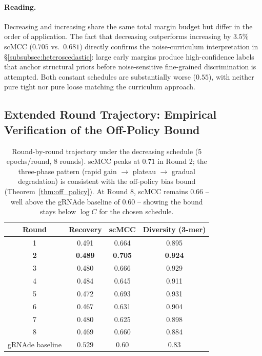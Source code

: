 {{\paragraph{Reading.}
Decreasing and increasing share the same total margin budget but differ in the order of application. The fact that decreasing outperforms increasing by $3.5\%$ scMCC ($0.705$ vs.\ $0.681$) directly confirms the noise-curriculum interpretation in \S\ref{subsubsec:heteroscedastic}: large early margins produce high-confidence labels that anchor structural priors before noise-sensitive fine-grained discrimination is attempted. Both constant schedules are substantially worse ($0.55$), with neither pure tight nor pure loose matching the curriculum approach.


\subsection{Extended Round Trajectory: Empirical Verification of the Off-Policy Bound}
\label{app:extended_rounds}

\begin{table}[h]
\centering
\caption{Round-by-round trajectory under the decreasing schedule (5 epochs/round, 8 rounds). scMCC peaks at $0.71$ in Round 2; the three-phase pattern (rapid gain $\to$ plateau $\to$ gradual degradation) is consistent with the off-policy bias bound (Theorem~\ref{thm:off_policy}). At Round 8, scMCC remains $0.66$ -- well above the gRNAde baseline of $0.60$ -- showing the bound stays below $\log C$ for the chosen schedule.}
\label{tab:extended_rounds}
\small
\begin{tabular}{cccc}
\toprule
\textbf{Round} & \textbf{Recovery} & \textbf{scMCC} & \textbf{Diversity (3-mer)} \\
\midrule
1 & 0.491 & 0.664 & 0.895 \\
\textbf{2} & \textbf{0.489} & \textbf{0.705} & \textbf{0.924} \\
3 & 0.480 & 0.666 & 0.929 \\
4 & 0.484 & 0.645 & 0.911 \\
5 & 0.472 & 0.693 & 0.931 \\
6 & 0.467 & 0.631 & 0.904 \\
7 & 0.480 & 0.625 & 0.898 \\
8 & 0.469 & 0.660 & 0.884 \\
\midrule
gRNAde baseline & $0.529$ & $0.60$ & $0.83$ \\
\bottomrule
\end{tabular}
\end{table}


}}
